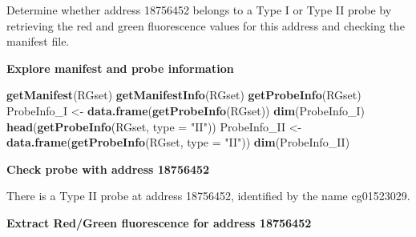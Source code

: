 \documentclass[
  11pt,
]{article}
\newenvironment{Shaded}{\begin{snugshade}}{\end{snugshade}}
\newcommand{\AttributeTok}[1]{\textcolor[rgb]{0.13,0.29,0.53}{#1}}
\newcommand{\FunctionTok}[1]{\textcolor[rgb]{0.13,0.29,0.53}{\textbf{#1}}}
\newcommand{\NormalTok}[1]{#1}
\newcommand{\OtherTok}[1]{\textcolor[rgb]{0.56,0.35,0.01}{#1}}
\newcommand{\SpecialCharTok}[1]{\textcolor[rgb]{0.81,0.36,0.00}{\textbf{#1}}}
\newcommand{\StringTok}[1]{\textcolor[rgb]{0.31,0.60,0.02}{#1}}
\begin{document}
Determine whether address 18756452 belongs to a Type I or Type II probe
by retrieving the red and green fluorescence values for this address and
checking the manifest file.

\textbf{Explore manifest and probe information}

\begin{Shaded}
\begin{Highlighting}[]
\FunctionTok{getManifest}\NormalTok{(RGset)}
\FunctionTok{getManifestInfo}\NormalTok{(RGset)}
\FunctionTok{getProbeInfo}\NormalTok{(RGset)}
\NormalTok{ProbeInfo\_I }\OtherTok{\textless{}{-}} \FunctionTok{data.frame}\NormalTok{(}\FunctionTok{getProbeInfo}\NormalTok{(RGset))}
\FunctionTok{dim}\NormalTok{(ProbeInfo\_I)}
\FunctionTok{head}\NormalTok{(}\FunctionTok{getProbeInfo}\NormalTok{(RGset, }\AttributeTok{type =} \StringTok{"II"}\NormalTok{))}
\NormalTok{ProbeInfo\_II }\OtherTok{\textless{}{-}} \FunctionTok{data.frame}\NormalTok{(}\FunctionTok{getProbeInfo}\NormalTok{(RGset, }\AttributeTok{type =} \StringTok{"II"}\NormalTok{))}
\FunctionTok{dim}\NormalTok{(ProbeInfo\_II)}
\end{Highlighting}
\end{Shaded}

\textbf{Check probe with address 18756452}

\begin{Shaded}
\end{Shaded}

There is a Type II probe at address 18756452, identified by the name
cg01523029.

\textbf{Extract Red/Green fluorescence for address 18756452}

\begin{Shaded}
\end{Shaded}
\end{document}

